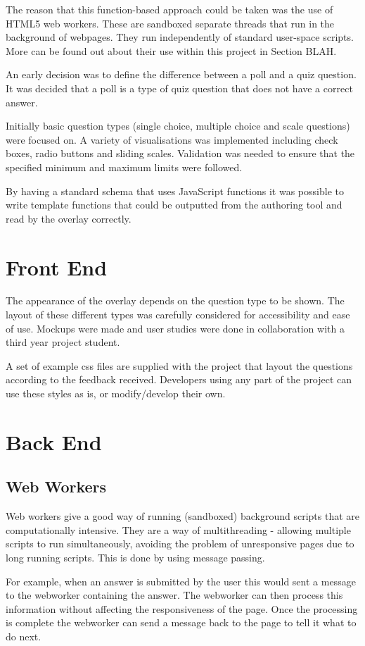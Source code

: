 The reason that this function-based approach could be taken was the use of HTML5 web workers. These are sandboxed separate threads that run in the background of webpages. They run independently of standard user-space scripts. More can be found out about their use within this project in Section BLAH. 

An early decision was to define the difference between a poll and a quiz question. It was decided that a poll is a type of quiz question that does not have a correct answer.

Initially basic question types (single choice, multiple choice and scale questions) were focused on. A variety of visualisations was implemented including check boxes, radio buttons and sliding scales. Validation was needed to ensure that the specified minimum and maximum limits were followed.

By having a standard schema that uses JavaScript functions it was possible to write template functions that could be outputted from the authoring tool and read by the overlay correctly.
\section{Front End} 
\label{Section:Front end}
The appearance of the overlay depends on the question type to be shown. The layout of these different types was carefully considered for accessibility and ease of use. Mockups were made and user studies were done in collaboration with a third year project student.

A set of example css files are supplied with the project that layout the questions according to the feedback received. Developers using any part of the project can use these styles as is, or modify/develop their own.
\section{Back End} 
\label{Section:Back end}
\subsection{Web Workers}
\label{Subsection:WebWorkers}
Web workers give a good way of running (sandboxed) background scripts that are computationally intensive. They are a way of multithreading - allowing multiple scripts to run simultaneously, avoiding the problem of unresponsive pages due to long running scripts. This is done by using message passing. 

For example, when an answer is submitted by the user this would sent a message to the webworker containing the answer. The webworker can then process this information without affecting the responsiveness of the page. Once the processing is complete the webworker can send a message back to the page to tell it what to do next.

